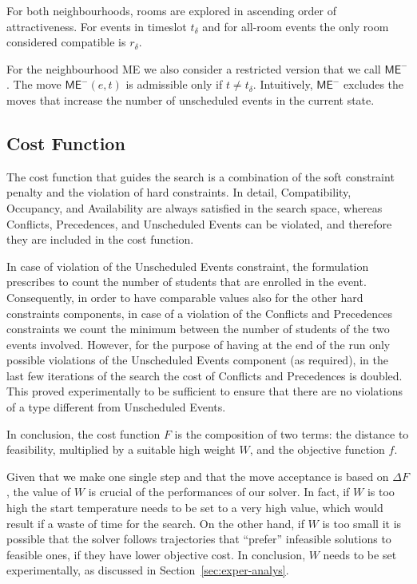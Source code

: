 \documentclass[authoryear,preprint,a4paper,12pt]{elsarticle}
\begin{document}
For both neighbourhoods, rooms are explored in ascending order of
attractiveness. For events in timeslot $t_\delta$ and for all-room events the only room considered compatible is
$r_\delta$.

For the neighbourhood \textsf{ME} we also consider a restricted version
that we call $\mathsf{ME}^-$. The move $\mathsf{ME^-}(e,t)$ is
admissible only if $t \neq t_\delta$. Intuitively, $\mathsf{ME}^-$
excludes the moves that increase the number of unscheduled events in
the current state.

\subsection{Cost Function}
\label{sec:cost-function-pectt}

The cost function that guides the search is a combination of the
soft constraint penalty and the violation of hard constraints. In
detail, \textsf{Compatibility}, \textsf{Occupancy}, and
\textsf{Availability} are always satisfied in the search space,
whereas \textsf{Conflicts}, \textsf{Precedences}, and
\textsf{Unscheduled Events} can be violated, and therefore they are
included in the cost function.

In case of violation of the \textsf{Unscheduled Events} constraint,
the formulation prescribes to count the number of students that are
enrolled in the event. Consequently, in order to have comparable
values also for the other hard constraints components, in case of a
violation of the \textsf{Conflicts} and \textsf{Precedences}
constraints we count the minimum between the number of students of the
two events involved.  However, for the purpose of having at the end of
the run only possible violations of the \textsf{Unscheduled Events}
component (as required), in the last few iterations of the search the
cost of \textsf{Conflicts} and \textsf{Precedences} is doubled. This
proved experimentally to be sufficient to ensure that there are no
violations of a type different from \textsf{Unscheduled Events}.

In conclusion, the cost function $F$ is the composition of two
terms: the distance to feasibility, multiplied by a suitable high
weight $W$, and the objective function $f$.

Given that we make one single step and that the move acceptance is
based on $\Delta F$, the value of $W$ is crucial of the performances
of our solver. In fact, if $W$ is too high the start temperature needs
to be set to a very high value, which would result if a waste of time
for the search.  On the other hand, if $W$ is too small it is possible
that the solver follows trajectories that ``prefer'' infeasible
solutions to feasible ones, if they have lower objective cost. In
conclusion, $W$ needs to be set experimentally, as discussed in
Section~\ref{sec:exper-analys}.
\end{document}

